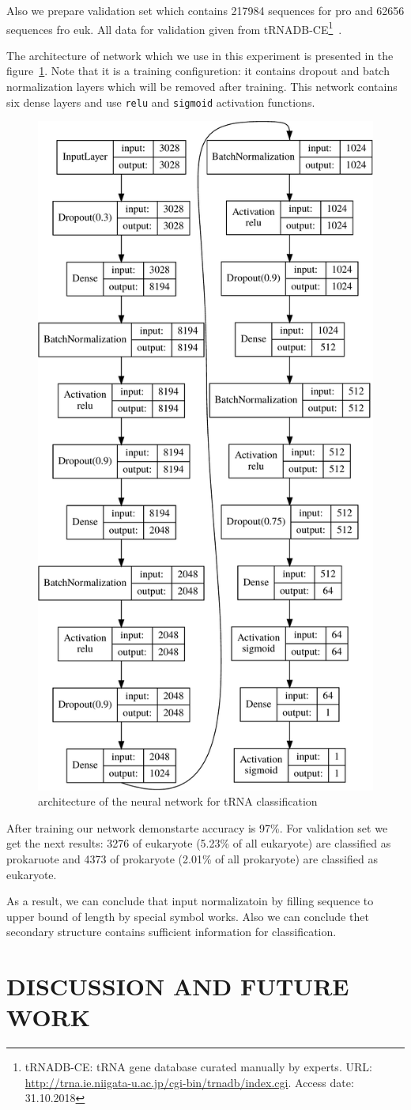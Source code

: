 \documentclass[a4paper,twoside]{article}
\begin{document}
Also we prepare validation set which contains 217984 sequences for pro and 62656 sequences fro euk.
All data for validation given from tRNADB-CE\footnote{tRNADB-CE: tRNA gene database curated manually by experts. URL: \url{http://trna.ie.niigata-u.ac.jp/cgi-bin/trnadb/index.cgi}. Access date: 31.10.2018}~\cite{Abe2010}.

The architecture of network which we use in this experiment is presented in the figure~\ref{fig:nn}.
Note that it is a training configuretion: it contains dropout and batch normalization layers which will be removed after training.
This network contains six dense layers and use \verb|relu| and \verb|sigmoid| activation functions.

\begin{figure}
\centering
\includegraphics[width=.4\textwidth]{figures/model-crop.pdf}
\caption{architecture of the neural network for tRNA classification}
\label{fig:nn}
\end{figure}

After training our network demonstarte accuracy is 97\%. 
For validation set we get the next results: 3276 of eukaryote (5.23\% of all eukaryote) are classified as prokaruote and 4373 of prokaryote (2.01\% of all prokaryote) are classified as eukaryote. 

As a result, we can conclude that input normalizatoin by filling sequence to upper bound of length by special symbol works.
Also we can conclude thet secondary structure contains sufficient information for classification.


\section{\uppercase{Discussion and Future Work}}
\label{sec:Discussion}
\end{document}
